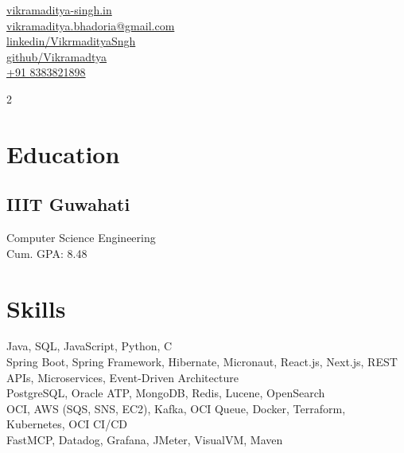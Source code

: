 \documentclass[]{hieudo-build}
\begin{document}
%
%
{
	\faGlobe \href{https://www.vikramaditya-singh.in}{ vikramaditya-singh.in} \\
	\faEnvelope \href{mailto:vikramaditya.bhadoria@gmail.com}{ vikramaditya.bhadoria@gmail.com} \\
	\faLinkedinSquare \href{https://www.linkedin.com/in/VikramadityaSngh}{ linkedin/VikrmadityaSngh} \\
	\faGithub \href{https://github.com/Vikramadtya}{ github/Vikramadtya} \\
	\faPhone \href{tel:+918383821898}{ +91 8383821898}
}

\begin{paracol}{2}

%
%

\section{Education} 

\subsection{IIIT Guwahati}
Computer Science Engineering \\
Cum. GPA: 8.48\\
\sectionsep

\section{Skills}
Java, SQL, JavaScript, Python, C \\
Spring Boot, Spring Framework, Hibernate, Micronaut, React.js, Next.js, REST APIs, Microservices, Event-Driven Architecture \\
PostgreSQL, Oracle ATP, MongoDB, Redis, Lucene, OpenSearch \\
OCI, AWS (SQS, SNS, EC2), Kafka, OCI Queue, Docker, Terraform, Kubernetes, OCI CI/CD \\
FastMCP, Datadog, Grafana, JMeter, VisualVM, Maven \\
\sectionsep


\end{paracol}
\end{document}
